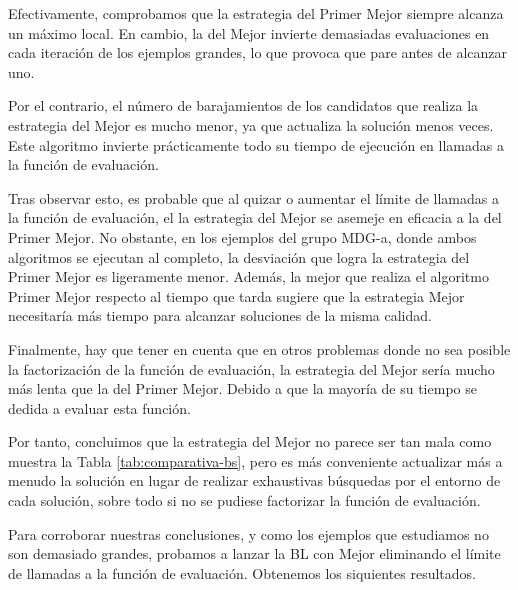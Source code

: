 \documentclass{article}
\begin{document}
Efectivamente, comprobamos que la estrategia del Primer Mejor siempre alcanza un máximo local. En cambio, la del Mejor
invierte demasiadas evaluaciones en cada iteración de los ejemplos grandes, lo que provoca que pare antes de alcanzar uno.

Por el contrario, el número de barajamientos de los candidatos que realiza la estrategia del Mejor es mucho menor, ya que
actualiza la solución menos veces. Este algoritmo invierte prácticamente todo su tiempo de ejecución en llamadas a la función
de evaluación.

Tras observar esto, es probable que al quizar o aumentar el límite de llamadas a la función de evaluación, el la estrategia del 
Mejor se asemeje en eficacia a la del Primer Mejor. No obstante, en los ejemplos del grupo MDG-a, donde ambos algoritmos se
 ejecutan al completo, la desviación que logra
la estrategia del Primer Mejor es ligeramente menor. Además, la mejor que realiza el algoritmo Primer Mejor respecto al tiempo que
tarda sugiere que la estrategia Mejor necesitaría más tiempo para alcanzar soluciones de la misma calidad.

Finalmente, hay que tener en cuenta que en otros problemas donde no sea posible la factorización de la función de evaluación,
la estrategia del Mejor sería mucho más lenta que la del Primer Mejor. Debido a que la mayoría de su tiempo se dedida a evaluar
esta función.

Por tanto, concluimos que la estrategia del Mejor no parece ser tan mala como muestra la Tabla \ref{tab:comparativa-bs}, pero
es más conveniente actualizar más a menudo la solución en lugar de realizar exhaustivas búsquedas por el entorno de cada solución,
sobre todo si no se pudiese factorizar la función de evaluación.

Para corroborar nuestras conclusiones, y como los ejemplos que estudiamos no son demasiado grandes, probamos a lanzar la BL
con Mejor eliminando el límite de llamadas a la función de evaluación. Obtenemos los siquientes resultados.
\end{document}
